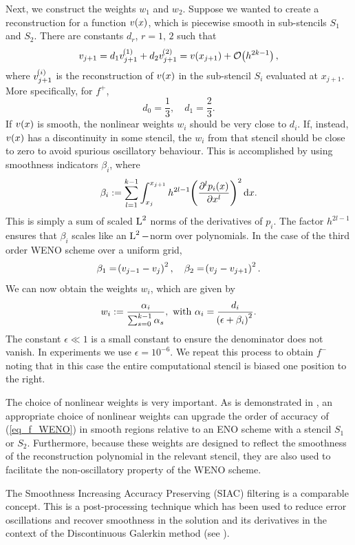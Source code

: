 \documentclass[final]{amsart}
\numberwithin{equation}{section}
\begin{document}
Next, we construct the weights $w_1$ and $w_2$.  Suppose
we wanted to create a reconstruction for a function $v\!\left({x}\right)$, which
is piecewise smooth in sub-stencils $S_1$ and $S_2$.  There are
constants $d_r$, $r=1,\,2$ such that
\begin{equation}
v_{j+1}=d_1v_{j+1}^{\!\left({1}\right)} +d_2v_{j+1}^{\!\left({2}\right)}=v\!\left({x_{j+1}}\right)+\mathcal{O}\!\left({h^{2k-1}}\right),
\end{equation} 
where $v^{\!\left({i}\right)}_{j+1}$ is the reconstruction of $v\!\left({x}\right)$ in the sub-stencil $S_i$ evaluated at $x_{j+1}$.  More specifically, for $f^+$,
\begin{equation}
d_0 = \frac{1}{3},\quad d_1=\frac{2}{3}.
\end{equation}
If $v\!\left({x}\right)$ is smooth, the nonlinear weights $w_i$ should
be very close to $d_i$.  If, instead, $v\!\left({x}\right)$ has a discontinuity in some
stencil, the $w_i$ from that stencil should be close to zero to avoid spurious oscillatory behaviour.
This is accomplished by using smoothness indicators $\beta_i$, where
\begin{equation}
\beta_i:=\sum_{l=1}^{k-1}\int^{x_{j+1}}_{x_j}h^{2l-1}\!\left({\frac{\partial^lp_i\!\left({x}\right)}{\partial x^l}}\right)^2\mathrm{d}x.
\end{equation}
This is simply a sum of scaled $\operatorname L^{2}$ norms of the derivatives of $p_i$.  The factor $h^{2l-1}$ ensures that $\beta_i$ scales like an $\operatorname L^{2}-$norm over polynomials. In the case of the third order WENO scheme over a uniform grid, 
\begin{equation}
\beta_1=\!\left({v_{j-1}-v_j}\right)^2,\quad \beta_2=\!\left({v_j-v_{j+1}}\right)^2.
\end{equation}
We can now obtain the weights $w_i$, which are given by
\begin{equation}\label{eq_non_lin_weights}
w_i:=\frac{\alpha_i}{\sum_{s=0}^{k-1}\alpha_s},  \text{ with  }\alpha_i = \frac{d_i}{\!\left({\epsilon +\beta_i}\right)^2}.
\end{equation}
The constant $\epsilon \ll 1$ is a small constant to ensure the
denominator does not vanish.  In experiments we use
$\epsilon=10^{-6}$.  We repeat this process to obtain $f^-$ noting
that in this case the entire computational stencil is biased one
position to the right.


\begin{Rem}
	The choice of nonlinear weights is very important.  As is
	demonstrated in \cite{jiang1996efficient}, an appropriate choice of
	nonlinear weights can upgrade the order of accuracy of
	(\ref{eq_f_WENO}) in smooth regions relative to an ENO scheme with a stencil $S_1$ or $S_2$.  Furthermore, because these weights are
	designed to reflect the smoothness of the reconstruction polynomial
	in the relevant stencil, they are also used to facilitate the
	non-oscillatory property of the WENO scheme.  
	
	The Smoothness Increasing Accuracy Preserving (SIAC) filtering is a comparable concept.  This is a post-processing technique which has been used to reduce error oscillations and recover smoothness in the solution and its derivatives in the context of the Discontinuous Galerkin method (see \cite{dedner2019residual}).
\end{Rem}
\end{document}
